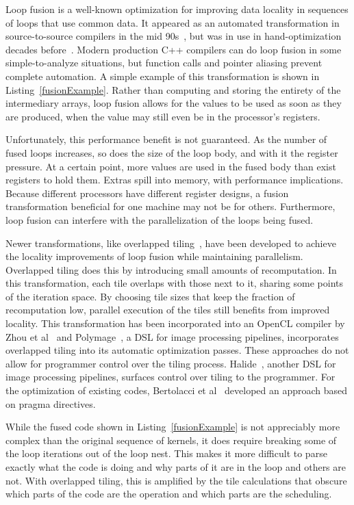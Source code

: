 Loop fusion is a well-known optimization for improving data locality in sequences of loops that use common data.
It appeared as an automated transformation in source-to-source compilers in the mid 90s~\cite{mckinley1996improving}, but was in use in hand-optimization decades before~\cite{warren1984hierarchical,cocke1971catalogue}.
Modern production C++ compilers can do loop fusion in some simple-to-analyze situations, but function calls and pointer aliasing prevent complete automation.
A simple example of this transformation is shown in Listing~\ref{fusionExample}.
Rather than computing and storing the entirety of the intermediary arrays, loop fusion allows for the values to be used as soon as they are produced, when the value may still even be in the processor's registers.

Unfortunately, this performance benefit is not guaranteed.
As the number of fused loops increases, so does the size of the loop body, and with it the register pressure. 
At a certain point, more values are used in the fused body than exist registers to hold them.
Extras spill into memory, with performance implications.
Because different processors have different register designs, a fusion transformation beneficial for one machine may not be for others.
Furthermore, loop fusion can interfere with the parallelization of the loops being fused.

Newer transformations, like overlapped tiling~\cite{holewinski2012high,krishnamoorthy2007effective}, have been developed to achieve the locality improvements of loop fusion while maintaining parallelism.
Overlapped tiling does this by introducing small amounts of recomputation.
In this transformation, each tile overlaps with those next to it, sharing some points of the iteration space.
By choosing tile sizes that keep the fraction of recomputation low, parallel execution of the tiles still benefits from improved locality.
This transformation has been incorporated into an OpenCL compiler by Zhou et al~\cite{zhou2012hierarchical} and Polymage~\cite{mullapudi2015polymage}, a DSL for image processing pipelines, incorporates overlapped tiling into its automatic optimization passes.
These approaches do not allow for programmer control over the tiling process.
Halide~\cite{ragan-kelley2013halide}, another DSL for image processing pipelines, surfaces control over tiling to the programmer.
For the optimization of existing codes, Bertolacci et al~\cite{bertolacci2019using} developed an approach based on pragma directives.

While the fused code shown in Listing~\ref{fusionExample} is not appreciably more complex than the original sequence of kernels, it does require breaking some of the loop iterations out of the loop nest.
This makes it more difficult to parse exactly what the code is doing and why parts of it are in the loop and others are not.
With overlapped tiling, this is amplified by the tile calculations that obscure which parts of the code are the operation and which parts are the scheduling. 

